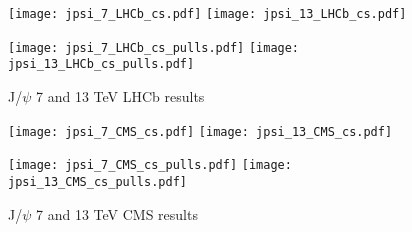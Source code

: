 \documentclass{article}
\begin{document}
\clearpage

\begin{figure}
\centering
\texttt{[image: jpsi\_7\_LHCb\_cs.pdf]}
\texttt{[image: jpsi\_13\_LHCb\_cs.pdf]}

\texttt{[image: jpsi\_7\_LHCb\_cs\_pulls.pdf]}
\texttt{[image: jpsi\_13\_LHCb\_cs\_pulls.pdf]}
\caption{J/$\psi$ 7 and 13 TeV LHCb results}
\end{figure}

\clearpage

\begin{figure}
\centering
\texttt{[image: jpsi\_7\_CMS\_cs.pdf]}
\texttt{[image: jpsi\_13\_CMS\_cs.pdf]}

\texttt{[image: jpsi\_7\_CMS\_cs\_pulls.pdf]}
\texttt{[image: jpsi\_13\_CMS\_cs\_pulls.pdf]}
\caption{J/$\psi$ 7 and 13 TeV CMS results}
\end{figure}

\clearpage


\end{document}
